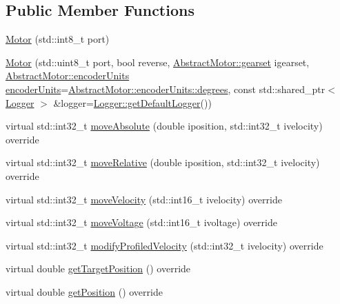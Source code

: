 \subsection*{Public Member Functions}
\begin{DoxyCompactItemize}
\item 
\mbox{\hyperlink{classokapi_1_1Motor_ae4d1eab9f7140508db8146adf6f4d8df}{Motor}} (std\+::int8\+\_\+t port)
\item 
\mbox{\hyperlink{classokapi_1_1Motor_afb244f7c74a9f6c6e2c40a8d7a5915ac}{Motor}} (std\+::uint8\+\_\+t port, bool reverse, \mbox{\hyperlink{classokapi_1_1AbstractMotor_a88aaa6ea2fa10f5520a537bbf26774d5}{Abstract\+Motor\+::gearset}} igearset, \mbox{\hyperlink{classokapi_1_1AbstractMotor_ae811cd825099f2defadeb1b7f7e7764c}{Abstract\+Motor\+::encoder\+Units}} \mbox{\hyperlink{classokapi_1_1AbstractMotor_ae811cd825099f2defadeb1b7f7e7764c}{encoder\+Units}}=\mbox{\hyperlink{classokapi_1_1AbstractMotor_ae811cd825099f2defadeb1b7f7e7764ca18daee01fc6e54aacd7f4c2eef60ff4d}{Abstract\+Motor\+::encoder\+Units\+::degrees}}, const std\+::shared\+\_\+ptr$<$ \mbox{\hyperlink{classokapi_1_1Logger}{Logger}} $>$ \&logger=\mbox{\hyperlink{classokapi_1_1Logger_a5053cf778b4b55acba788a3797dc96d2}{Logger\+::get\+Default\+Logger}}())
\item 
virtual std\+::int32\+\_\+t \mbox{\hyperlink{classokapi_1_1Motor_a5f95fd5864805b57f16fa5defdbf1968}{move\+Absolute}} (double iposition, std\+::int32\+\_\+t ivelocity) override
\item 
virtual std\+::int32\+\_\+t \mbox{\hyperlink{classokapi_1_1Motor_a40f6f70ed9b12d1834551d1232303ef1}{move\+Relative}} (double iposition, std\+::int32\+\_\+t ivelocity) override
\item 
virtual std\+::int32\+\_\+t \mbox{\hyperlink{classokapi_1_1Motor_afc3377b9b10a72de0c22e9a74cbcfd16}{move\+Velocity}} (std\+::int16\+\_\+t ivelocity) override
\item 
virtual std\+::int32\+\_\+t \mbox{\hyperlink{classokapi_1_1Motor_a64b53a041c90c7b7a3903c607a9b17eb}{move\+Voltage}} (std\+::int16\+\_\+t ivoltage) override
\item 
virtual std\+::int32\+\_\+t \mbox{\hyperlink{classokapi_1_1Motor_a8778f90005a3add64d0dfd7574fb8289}{modify\+Profiled\+Velocity}} (std\+::int32\+\_\+t ivelocity) override
\item 
virtual double \mbox{\hyperlink{classokapi_1_1Motor_af575af2b4d4cf5aea6e8aac50ef1cbbd}{get\+Target\+Position}} () override
\item 
virtual double \mbox{\hyperlink{classokapi_1_1Motor_a4592f8a1cce4474f85ceabd3d7e2fe0b}{get\+Position}} () override

\end{DoxyCompactItemize}
